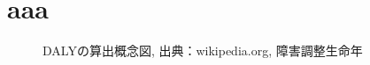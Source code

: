 \documentclass[a4j,11pt,mc]{jreport}
\begin{document}
\chapter{aaa}
\begin{figure}[h!]
	\begin{center}
			\caption{DALYの算出概念図, 出典：wikipedia.org, 障害調整生命年
		}
	\end{center}
\end{figure}





\newpage
\makeatletter
\renewcommand{\@biblabel}[1]{[#1]}
\makeatother



\end{document}
